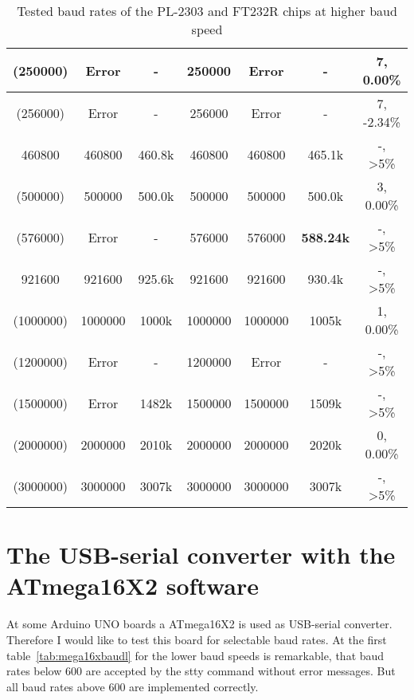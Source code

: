 \begin{table}[H]
\begin{center}
\begin{tabular}{| c | c | c || c | c | c || c |}
    \hline
    (250000) &  Error   &   -       &  250000   & Error  &    -      &   7, 0.00\%  \\
    \hline
    (256000) &  Error   &   -       &  256000   & Error  &    -      &   7, -2.34\%  \\
    \hline
     460800  &  460800  &  460.8k   &  460800   & 460800  & 465.1k   &   -, >5\%  \\
    \hline
    (500000) &  500000  &  500.0k   &  500000   & 500000 & 500.0k    &   3, 0.00\%  \\
    \hline
    (576000) &  Error  &    -       &  576000 & 576000 & \bf{588.24k} &   -, >5\%  \\
    \hline
     921600  &  921600  &  925.6k   & 921600   & 921600 &  930.4k   &   -, >5\%  \\
    \hline
   (1000000) & 1000000 &   1000k    &  1000000 & 1000000 & 1005k    &   1, 0.00\%  \\
    \hline
   (1200000)  &  Error &   -        & 1200000  & Error   &   -      &  -, >5\%  \\
    \hline
   (1500000) & Error  &    1482k    & 1500000  & 1500000 &  1509k   &  -, >5\%  \\
    \hline
   (2000000) & 2000000 &   2010k   & 2000000 & 2000000 &  2020k   & 0, 0.00\%  \\
    \hline
   (3000000) & 3000000 &   3007k   & 3000000  & 3000000 &  3007k    &  -, >5\%   \\
    \hline
    \end{tabular}
  \end{center}
  \caption{Tested baud rates of the PL-2303 and FT232R chips at higher baud speed}
  \label{tab:PL2302baudh}
\end{table}


\section{The USB-serial converter with the ATmega16X2 software}

At some Arduino UNO boards a ATmega16X2 is used as USB-serial converter.
Therefore I would like to test this board for selectable baud rates.
At the first table~\ref{tab:mega16xbaudl} for the lower baud speeds is remarkable,
that baud rates below 600 are accepted by the stty command without error messages.
But all baud rates above 600 are implemented correctly.


